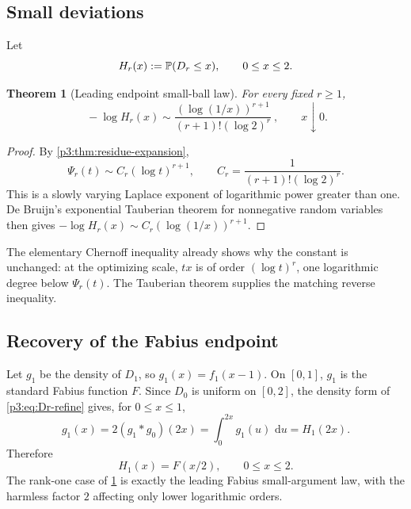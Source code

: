 \documentclass[11pt,oneside]{article}
\newtheorem{theorem}{Theorem}[section]
\theoremstyle{definition}
\theoremstyle{remark}
\newcommand{\dd}{\,\mathrm d}
\begin{document}
\subsection{Small deviations}

Let
\begin{equation}\label{p3:eq:Hr}
  H_r(x):=\mathbb P(D_r\le x),\qquad 0\le x\le2.
\end{equation}

\begin{theorem}[Leading endpoint small-ball law]\label{p3:thm:small-ball}
For every fixed $r\ge1$,
\begin{equation}\label{p3:eq:small-ball}
 \boxed{\ 
 -\log H_r(x)
 \sim\frac{(\log(1/x))^{r+1}}
 {(r+1)!(\log2)^r}
 \ },\qquad x\downarrow0.
\end{equation}
\end{theorem}

\begin{proof}
By \cref{p3:thm:residue-expansion},
\[
 \Psi_r(t)\sim C_r(\log t)^{r+1},
 \qquad
 C_r=\frac1{(r+1)!(\log2)^r}.
\]
This is a slowly varying Laplace exponent of logarithmic power greater than one.  De Bruijn's exponential Tauberian theorem for nonnegative random variables \cite{p3:debruijn1959} then gives
$-\log H_r(x)\sim C_r(\log(1/x))^{r+1}$.
\end{proof}

\begin{remark}
The elementary Chernoff inequality already shows why the constant is unchanged: at the optimizing scale, $tx$ is of order $(\log t)^r$, one logarithmic degree below $\Psi_r(t)$.  The Tauberian theorem supplies the matching reverse inequality.
\end{remark}

\subsection{Recovery of the Fabius endpoint}

Let $g_1$ be the density of $D_1$, so $g_1(x)=f_1(x-1)$.  On $[0,1]$, $g_1$ is the standard Fabius function $F$.  Since $D_0$ is uniform on $[0,2]$, the density form of \eqref{p3:eq:Dr-refine} gives, for $0\le x\le1$,
\[
 g_1(x)=2(g_1*g_0)(2x)=\int_0^{2x}g_1(u)\,\dd u=H_1(2x).
\]
Therefore
\begin{equation}\label{p3:eq:H1-F}
  H_1(x)=F(x/2),\qquad 0\le x\le2.
\end{equation}
The rank-one case of \cref{p3:thm:small-ball} is exactly the leading Fabius small-argument law, with the harmless factor $2$ affecting only lower logarithmic orders.
\end{document}
